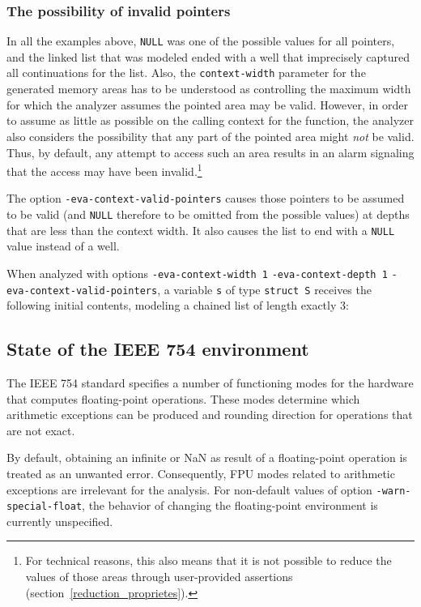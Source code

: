 \documentclass{frama-c-book}
\begin{document}
\subsubsection{The possibility of invalid pointers}

In all the examples above, \lstinline|NULL| was one of the
possible values for all pointers, and the linked list that was
modeled ended with a well that imprecisely captured all continuations
for the list. Also, the \lstinline|context-width| parameter
for the generated memory areas has to be understood as controlling the maximum
width for which the analyzer assumes the pointed area may be valid.
However, in order to assume as little as possible on the calling context
for the function, the analyzer also
considers the possibility that any part of the pointed area might \emph{not} be
valid. Thus, by default, any attempt to access such an area results in an alarm
signaling that the access may have been invalid.\footnote{For technical
reasons, this also means that it is not possible to reduce the values
of those areas through user-provided assertions
(section~\ref{reduction_proprietes}).
}

The option \lstinline|-eva-context-valid-pointers| causes
those pointers to be assumed to be valid (and
\lstinline|NULL| therefore to be omitted from the possible values)
at depths that are less than the context width.
It also causes the list to end with a
\lstinline|NULL| value instead of a well.

When analyzed with options
\lstinline|-eva-context-width 1| \lstinline|-eva-context-depth 1|
\lstinline|-eva-context-valid-pointers|,
a variable \lstinline|s| of
type \lstinline|struct S| receives  the following initial contents,
modeling a chained list of length exactly 3:


\subsection{State of the IEEE 754 environment}

The IEEE 754 standard specifies a number of functioning modes for
the hardware that computes floating-point operations. These modes
determine which arithmetic exceptions can be produced and rounding
direction for operations that are not exact.

By default, obtaining an
infinite or NaN as result of a floating-point operation is treated
as an unwanted error. Consequently, FPU modes related to arithmetic
exceptions are irrelevant for the analysis.
For non-default values of option \texttt{-warn-special-float}, the
behavior of changing the floating-point environment is currently unspecified.
\end{document}
